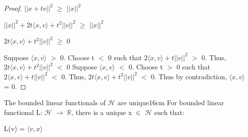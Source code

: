 \begin{proof}
        \hspace{0.5cm}
        $||x+tv||^2$ $\geq$ $||x||^2$

        \hspace{0.5cm}
        $||x||^2 + 2t \langle x , v \rangle + t^2 ||v||^2$ $\geq$ $||x||^2$

        \hspace{0.5cm}
        $2t \langle x , v \rangle + t^2 ||v||^2$ $\geq$ 0

        Suppose $\langle x , v \rangle$ $>$ 0. Choose t $<$ 0
        such that $2 \langle x , v \rangle + t ||v||^2$ $>$ 0.
        Thus, $2t \langle x , v \rangle + t^2 ||v||^2$ $<$ 0
        Suppose $\langle x , v \rangle$ $<$ 0. Choose t $>$ 0
        such that $2 \langle x , v \rangle + t ||v||^2$ $<$ 0.
        Thus, $2t \langle x , v \rangle + t^2 ||v||^2$ $<$ 0.
        Thus by contradiction, $\langle x , v \rangle$ = 0.
    \end{proof}

    \vspace{0.5cm}



    \begin{wtheorem}{The bounded linear functionals of $\mathcal{H}$
    are unique}{16cm}
        For bounded linear functional L: $\mathcal{H}$ $\rightarrow$ $\mathbb{R}$,
        there is a unique x $\in$ $\mathcal{H}$ such that:

        \hspace{0.5cm}
        L(v) = $\langle v , x \rangle$
    \end{wtheorem}

